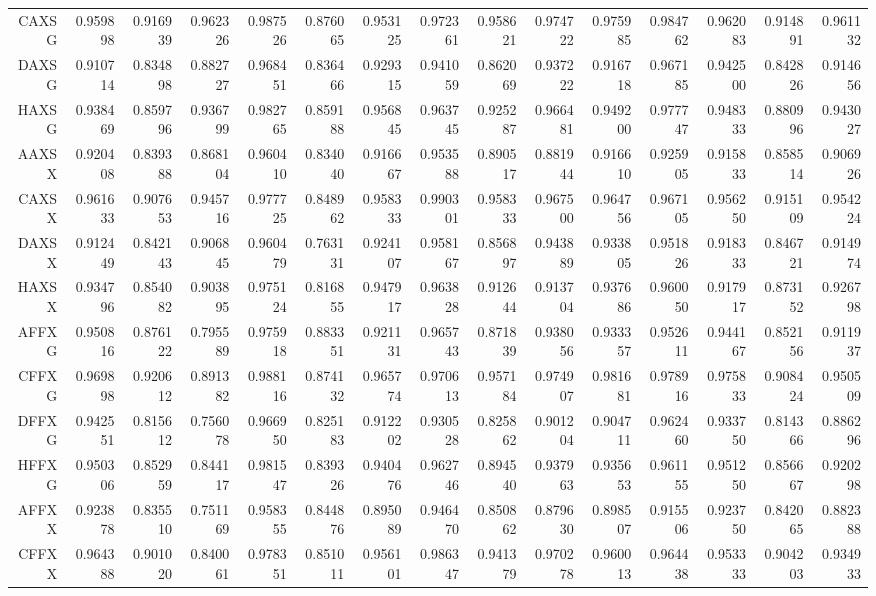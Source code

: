 {\begin{tabular}{rrrrrrrrrrrrrrr}
	CAXSG & 0.959898 & 0.916939 & 0.962326 & 0.987526 & 0.876065 & 0.953125 & 0.972361 & 0.958621 & 0.974722 & 0.975985 & 0.984762 & 0.962083 & 0.914891 & 0.961132 \\ 
	DAXSG & 0.910714 & 0.834898 & 0.882727 & 0.968451 & 0.836466 & 0.929315 & 0.941059 & 0.862069 & 0.937222 & 0.916718 & 0.967185 & 0.942500 & 0.842826 & 0.914656 \\ 
	HAXSG & 0.938469 & 0.859796 & 0.936799 & 0.982765 & 0.859188 & 0.956845 & 0.963745 & 0.925287 & 0.966481 & 0.949200 & 0.977747 & 0.948333 & 0.880996 & 0.943027 \\ 
	AAXSX & 0.920408 & 0.839388 & 0.868104 & 0.960410 & 0.834040 & 0.916667 & 0.953588 & 0.890517 & 0.881944 & 0.916610 & 0.925905 & 0.915833 & 0.858514 & 0.906926 \\ 
	CAXSX & 0.961633 & 0.907653 & 0.945716 & 0.977725 & 0.848962 & 0.958333 & 0.990301 & 0.958333 & 0.967500 & 0.964756 & 0.967105 & 0.956250 & 0.915109 & 0.954224 \\ 
	DAXSX & 0.912449 & 0.842143 & 0.906845 & 0.960479 & 0.763131 & 0.924107 & 0.958167 & 0.856897 & 0.943889 & 0.933805 & 0.951826 & 0.918333 & 0.846721 & 0.914974 \\ 
	HAXSX & 0.934796 & 0.854082 & 0.903895 & 0.975124 & 0.816855 & 0.947917 & 0.963828 & 0.912644 & 0.913704 & 0.937686 & 0.960050 & 0.917917 & 0.873152 & 0.926798 \\ 
	AFFXG & 0.950816 & 0.876122 & 0.795589 & 0.975918 & 0.883351 & 0.921131 & 0.965743 & 0.871839 & 0.938056 & 0.933357 & 0.952611 & 0.944167 & 0.852156 & 0.911937 \\ 
	CFFXG & 0.969898 & 0.920612 & 0.891382 & 0.988116 & 0.874132 & 0.965774 & 0.970613 & 0.957184 & 0.974907 & 0.981681 & 0.978916 & 0.975833 & 0.908424 & 0.950509 \\ 
	DFFXG & 0.942551 & 0.815612 & 0.756078 & 0.966950 & 0.825183 & 0.912202 & 0.930528 & 0.825862 & 0.901204 & 0.904711 & 0.962460 & 0.933750 & 0.814366 & 0.886296 \\ 
	HFFXG & 0.950306 & 0.852959 & 0.844117 & 0.981547 & 0.839326 & 0.940476 & 0.962746 & 0.894540 & 0.937963 & 0.935653 & 0.961155 & 0.951250 & 0.856667 & 0.920298 \\ 
	AFFXX & 0.923878 & 0.835510 & 0.751169 & 0.958355 & 0.844876 & 0.895089 & 0.946470 & 0.850862 & 0.879630 & 0.898507 & 0.915506 & 0.923750 & 0.842065 & 0.882388 \\ 
	CFFXX & 0.964388 & 0.901020 & 0.840061 & 0.978351 & 0.851011 & 0.956101 & 0.986347 & 0.941379 & 0.970278 & 0.960013 & 0.964438 & 0.953333 & 0.904203 & 0.934933 \\ 

\end{tabular}}
